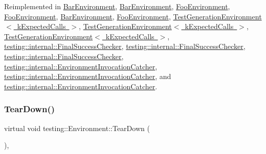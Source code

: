 Reimplemented in \mbox{\hyperlink{class_bar_environment_ac02b15d5b27e33232c578f0340442bbb}{Bar\+Environment}}, \mbox{\hyperlink{class_bar_environment_ac02b15d5b27e33232c578f0340442bbb}{Bar\+Environment}}, \mbox{\hyperlink{class_foo_environment_a68511512cce59c5b848dc23b1300dc5a}{Foo\+Environment}}, \mbox{\hyperlink{class_foo_environment_a68511512cce59c5b848dc23b1300dc5a}{Foo\+Environment}}, \mbox{\hyperlink{class_bar_environment_a384f951da72a2a18bb0c2b3506376b09}{Bar\+Environment}}, \mbox{\hyperlink{class_foo_environment_a99a2c9df52106cce9e7a4bdda53df802}{Foo\+Environment}}, \mbox{\hyperlink{class_test_generation_environment_ac3787d8afb43b97b0b3d6dec78b04798}{Test\+Generation\+Environment$<$ k\+Expected\+Calls $>$}}, \mbox{\hyperlink{class_test_generation_environment_af7731d3161d89e3bd456cd204e2c4890}{Test\+Generation\+Environment$<$ k\+Expected\+Calls $>$}}, \mbox{\hyperlink{class_test_generation_environment_af7731d3161d89e3bd456cd204e2c4890}{Test\+Generation\+Environment$<$ k\+Expected\+Calls $>$}}, \mbox{\hyperlink{classtesting_1_1internal_1_1_final_success_checker_a15ba1169b52bbf73a3ccea0c9f55cefd}{testing\+::internal\+::\+Final\+Success\+Checker}}, \mbox{\hyperlink{classtesting_1_1internal_1_1_final_success_checker_a15ba1169b52bbf73a3ccea0c9f55cefd}{testing\+::internal\+::\+Final\+Success\+Checker}}, \mbox{\hyperlink{classtesting_1_1internal_1_1_final_success_checker_a8f39d12a1f2bfe8c6c04b5c6749382c9}{testing\+::internal\+::\+Final\+Success\+Checker}}, \mbox{\hyperlink{classtesting_1_1internal_1_1_environment_invocation_catcher_a50097d7cb8997fef0e2df90a564949f0}{testing\+::internal\+::\+Environment\+Invocation\+Catcher}}, \mbox{\hyperlink{classtesting_1_1internal_1_1_environment_invocation_catcher_a50097d7cb8997fef0e2df90a564949f0}{testing\+::internal\+::\+Environment\+Invocation\+Catcher}}, and \mbox{\hyperlink{classtesting_1_1internal_1_1_environment_invocation_catcher_afc89ee0a8e32e6746a89fcc1682f62e9}{testing\+::internal\+::\+Environment\+Invocation\+Catcher}}.

\mbox{\label{classtesting_1_1_environment_a039bdaa705c46b9b88234cf4d3bb6254}} 
\subsubsection{\texorpdfstring{TearDown()}{TearDown()}\hspace{0.1cm}{\footnotesize\ttfamily [3/3]}}
{\footnotesize\ttfamily virtual void testing\+::\+Environment\+::\+Tear\+Down (\begin{DoxyParamCaption}{ }\end{DoxyParamCaption})\hspace{0.3cm}{\ttfamily [inline]}, {\ttfamily [virtual]}}



